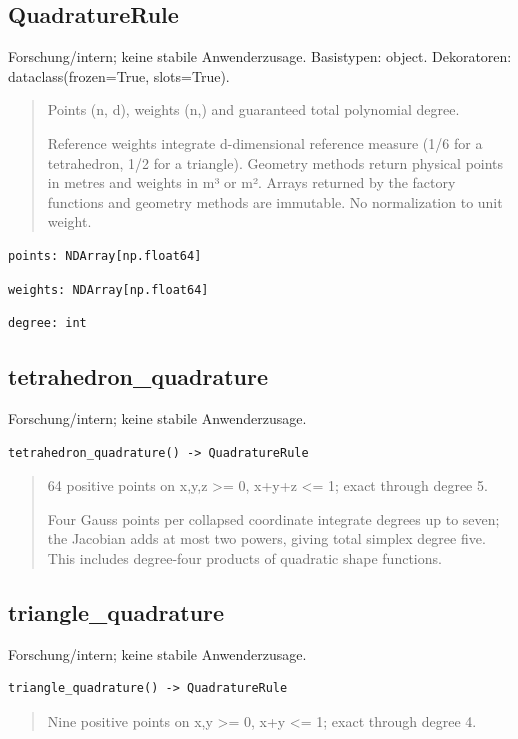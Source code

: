 \subsection{QuadratureRule}
Forschung/intern; keine stabile Anwenderzusage.
Basistypen: object. Dekoratoren: dataclass(frozen=True, slots=True).
\begin{quote}
Points (n, d), weights (n,) and guaranteed total polynomial degree.\par Reference weights integrate d-dimensional reference measure (1/6 for a tetrahedron, 1/2 for a triangle). Geometry methods return physical points in metres and weights in m³ or m². Arrays returned by the factory functions and geometry methods are immutable. No normalization to unit weight.
\end{quote}
\begin{lstlisting}
points: NDArray[np.float64]
\end{lstlisting}
\begin{lstlisting}
weights: NDArray[np.float64]
\end{lstlisting}
\begin{lstlisting}
degree: int
\end{lstlisting}
\subsection{tetrahedron\_quadrature}
Forschung/intern; keine stabile Anwenderzusage.
\begin{lstlisting}
tetrahedron_quadrature() -> QuadratureRule
\end{lstlisting}
\begin{quote}
64 positive points on x,y,z >= 0, x+y+z <= 1; exact through degree 5.\par Four Gauss points per collapsed coordinate integrate degrees up to seven; the Jacobian adds at most two powers, giving total simplex degree five. This includes degree-four products of quadratic shape functions.
\end{quote}
\subsection{triangle\_quadrature}
Forschung/intern; keine stabile Anwenderzusage.
\begin{lstlisting}
triangle_quadrature() -> QuadratureRule
\end{lstlisting}
\begin{quote}
Nine positive points on x,y >= 0, x+y <= 1; exact through degree 4.
\end{quote}
